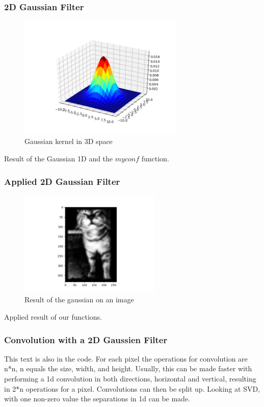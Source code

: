 \documentclass[12pt]{article}
\begin{document}
\subsubsection{2D Gaussian Filter}
\begin{figure}[!htb]
  \centering
  \includegraphics[width=0.7\textwidth]{pics/1_5_s}
  \caption{Gaussian kernel in 3D space}
\end{figure}
Result of the Gaussian 1D and the $myconf$ function.

\subsubsection{Applied 2D Gaussian Filter}
\FloatBarrier
\begin{figure}[!htb]
  \centering
  \includegraphics[width=0.6\textwidth]{pics/1_6_s}
  \caption{Result of the gaussian on an image}
\end{figure}
Applied result of our functions.
\pagebreak
\FloatBarrier
\subsubsection{Convolution with a 2D Gaussien Filter}
This text is also in the code. \newline
For each pixel the operations for convolution are n*n, n equals the size, width,
and height. Usually, this can be made faster with performing a 1d convolution in
both directions, horizontal and vertical, resulting in 2*n operations for a pixel.
Convolutions can then be split up. Looking at SVD, with one non-zero
value the separations in 1d can be made.
\end{document}
